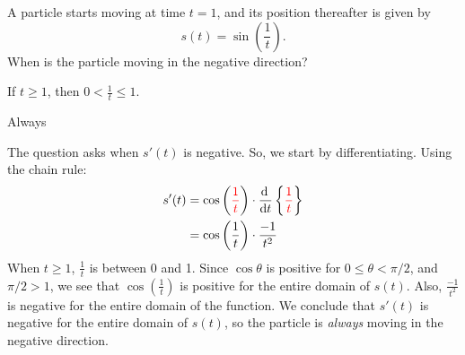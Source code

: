 \begin{Mquestion}
A particle starts moving at time $t=1$, and its position thereafter  is given by
\[s(t)=\sin\left(\frac{1}{t}\right).\]
 When is the particle moving in the negative direction?
\end{Mquestion}
\begin{hint}
If $t \ge 1$, then $0<\frac{1}{t} \leq 1$.
\end{hint}
\begin{answer}
Always
\end{answer}
\begin{solution}
The question asks when $s'(t)$ is negative. So, we start by differentiating. Using the chain rule:
\begin{align*}
s'(t)&=\cos\left(\textcolor{red}{\frac{1}{t}}\right)\cdot\diff{}{t}\left\{\textcolor{red}{\frac{1}{t}}\right\}\\
&=\cos\left({\frac{1}{t}}\right)\cdot\frac{-1}{t^2}
\end{align*}
When $t\ge1$, $\frac{1}{t}$ is between 0 and 1. Since $\cos \theta$ is positive for $0 \leq \theta < \pi/2$, and $\pi/2 >1$, we see that $\cos\left(\frac{1}{t}\right)$ is positive for the entire domain of $s(t)$. Also, $\frac{-1}{t^2}$ is negative for the entire domain of the function. We conclude that $s'(t)$ is negative for the entire domain of $s(t)$, so the particle is \emph{always} moving in the negative direction.
\end{solution}


